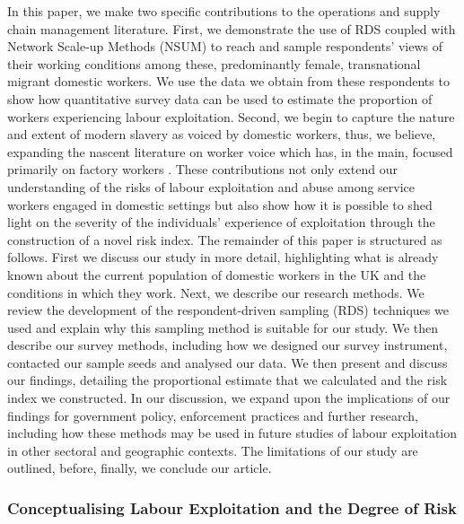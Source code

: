 \documentclass[
  12pt,
  letterpaper,
  DIV=11,
  numbers=noendperiod]{scrartcl}
\theoremstyle{plain}
\theoremstyle{definition}
\begin{document}
In this paper, we make two specific contributions to the operations and
supply chain management literature. First, we demonstrate the use of RDS
coupled with Network Scale-up Methods (NSUM) to reach and sample
respondents' views of their working conditions among these,
predominantly female, transnational migrant domestic workers. We use the
data we obtain from these respondents to show how quantitative survey data can be
used to estimate the proportion of workers experiencing labour
exploitation. Second, we begin to capture the nature and extent of
modern slavery as voiced by domestic workers, thus, we
believe, expanding the nascent literature on worker voice which has, in
the main, focused primarily on factory workers
\autocite{stephens_theorising_2024}. These contributions
not only extend our understanding of the risks of labour exploitation
and abuse among service workers engaged in domestic settings but also
show how it is possible to shed light on the severity of the
individuals' experience of exploitation through the construction of a
novel risk index. The remainder of this paper is structured as follows.
First we discuss our study in more detail, highlighting what is already known about the
current population of domestic workers in the UK and the conditions in
which they work. Next, we describe our research methods. We review the
development of the respondent-driven sampling (RDS) techniques we used
and explain why this sampling method is suitable for our study. We then
describe our survey methods, including how we designed our survey
instrument, contacted our sample seeds and analysed our data. We then
present and discuss our findings, detailing the proportional estimate
that we calculated and the risk index we constructed. In our discussion,
we expand upon the implications of our findings for government policy,
enforcement practices and further research, including how these methods
may be used in future studies of labour exploitation in other sectoral
and geographic contexts. The limitations of our study are outlined,
before, finally, we conclude our article.

\subsubsection{Conceptualising Labour Exploitation and the Degree of
Risk}\label{conceptualising-labour-exploitation-and-the-degree-of-risk}
\end{document}
